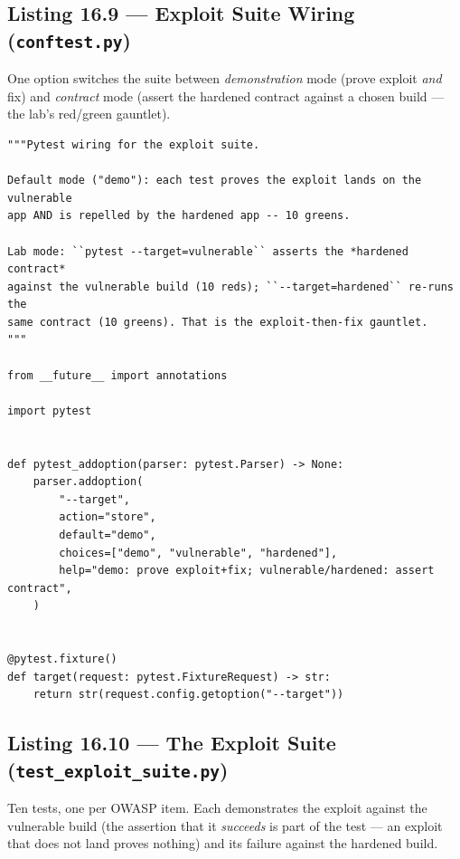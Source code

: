 \subsection{Listing 16.9 --- Exploit Suite Wiring (\texttt{conftest.py})}
\label{lst:ch16-conftest}

One option switches the suite between \emph{demonstration} mode (prove
exploit \emph{and} fix) and \emph{contract} mode (assert the hardened
contract against a chosen build --- the lab's red/green gauntlet).

\begin{verbatim}
"""Pytest wiring for the exploit suite.

Default mode ("demo"): each test proves the exploit lands on the vulnerable
app AND is repelled by the hardened app -- 10 greens.

Lab mode: ``pytest --target=vulnerable`` asserts the *hardened contract*
against the vulnerable build (10 reds); ``--target=hardened`` re-runs the
same contract (10 greens). That is the exploit-then-fix gauntlet.
"""

from __future__ import annotations

import pytest


def pytest_addoption(parser: pytest.Parser) -> None:
    parser.addoption(
        "--target",
        action="store",
        default="demo",
        choices=["demo", "vulnerable", "hardened"],
        help="demo: prove exploit+fix; vulnerable/hardened: assert contract",
    )


@pytest.fixture()
def target(request: pytest.FixtureRequest) -> str:
    return str(request.config.getoption("--target"))
\end{verbatim}

\subsection{Listing 16.10 --- The Exploit Suite (\texttt{test\_exploit\_suite.py})}
\label{lst:ch16-exploitsuite}

Ten tests, one per OWASP item. Each demonstrates the exploit against the
vulnerable build (the assertion that it \emph{succeeds} is part of the
test --- an exploit that does not land proves nothing) and its failure
against the hardened build.

